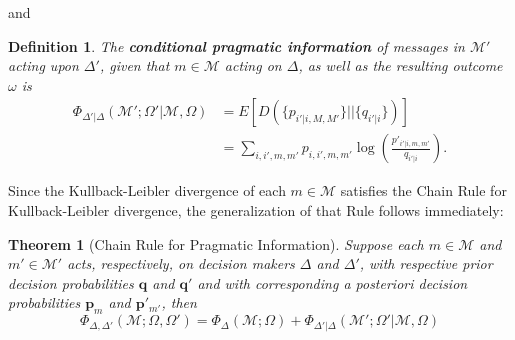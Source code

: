 \documentclass[11pt]{article}
\newtheorem*{definition}{Definition}
\newtheorem{theorem}{Theorem}[subsection]
\begin{document}
and  
\begin{definition}
The {\bf conditional pragmatic information} of messages in ${\mathcal M'}$ acting upon $\Delta'$, given that $m \in \mathcal M$ acting on $\Delta$, as well as the resulting outcome $\omega$ is
\begin{align*}
 \Phi_{\Delta'| \Delta} (\mathcal M'; \Omega' | \mathcal M, \Omega) &= E \left[D(\{p_{i'|i,M,M'}\} || \{q_{i'|i}\}) \right] \\
                                      &= \sum_{i, i', m, m'} p_{i, i', m, m'} \log \left(\frac{p'_{i'|i,m,m'}}{q_{i'|i}}\right).
\end{align*}
\end{definition}
Since the Kullback-Leibler divergence of each $m \in \mathcal M$ satisfies the Chain Rule for Kullback-Leibler divergence, the generalization of that Rule follows immediately:
\begin{theorem}[Chain Rule for Pragmatic Information]
\label{PragmaticInfoChainRule}
Suppose each $m \in \mathcal M$ and $m' \in \mathcal M'$ acts, respectively, on decision makers $\Delta$ and $\Delta'$,   with respective prior decision probabilities $\mathbf q$ and $\mathbf q'$ and with corresponding {\rm a posteriori} decision probabilities $\mathbf p_m$ and $\mathbf p'_{m'}$, then
$$
 \Phi_{\Delta, \Delta'} (\mathcal M; \Omega, \Omega')=\Phi_{\Delta} ({\mathcal M}; \Omega)  +
\Phi_{\Delta'| \Delta} (\mathcal M'; \Omega' | \mathcal M, \Omega)
$$
\end{theorem}
\end{document}
